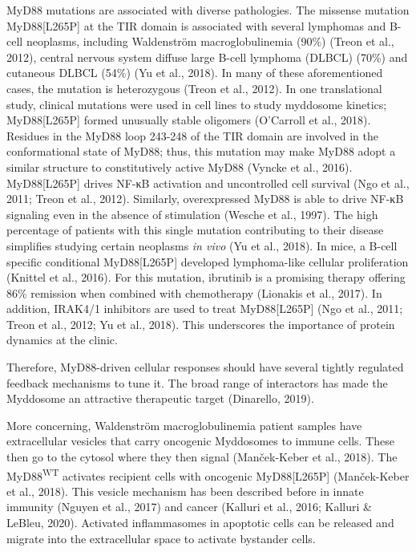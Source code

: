 MyD88 mutations are associated with diverse pathologies. The missense mutation MyD88[L265P] at the TIR domain is associated with several lymphomas and B-cell neoplasms, including Waldenström macroglobulinemia (90\%) (Treon et al., 2012), central nervous system diffuse large B-cell lymphoma (DLBCL) (70\%) and cutaneous DLBCL (54\%) (Yu et al., 2018). In many of these aforementioned cases, the mutation is heterozygous (Treon et al., 2012). In one translational study, clinical mutations were used in cell lines to study myddosome kinetics; MyD88[L265P] formed unusually stable oligomers (O’Carroll et al., 2018). Residues in the MyD88 loop 243-248 of the TIR domain are involved in the conformational state of MyD88; thus, this mutation may make MyD88 adopt a similar structure to constitutively active MyD88 (Vyncke et al., 2016). MyD88[L265P] drives NF-κB activation and uncontrolled cell survival (Ngo et al., 2011; Treon et al., 2012). Similarly, overexpressed MyD88 is able to drive NF-κB signaling even in the absence of stimulation (Wesche et al., 1997). The high percentage of patients with this single mutation contributing to their disease simplifies studying certain neoplasms \emph{in vivo} (Yu et al., 2018). In mice, a B-cell specific conditional MyD88[L265P] developed lymphoma-like cellular proliferation (Knittel et al., 2016). For this mutation, ibrutinib is a promising therapy offering 86\% remission when combined with chemotherapy (Lionakis et al., 2017). In addition, IRAK4/1 inhibitors are used to treat MyD88[L265P] (Ngo et al., 2011; Treon et al., 2012; Yu et al., 2018). This underscores the importance of protein dynamics at the clinic.

Therefore, MyD88-driven cellular responses should have several tightly regulated feedback mechanisms to tune it. The broad range of interactors has made the Myddosome an attractive therapeutic target (Dinarello, 2019).

More concerning, Waldenström macroglobulinemia patient samples have extracellular vesicles that carry oncogenic Myddosomes to immune cells. These then go to the cytosol where they then signal (Manček-Keber et al., 2018). The MyD88\textsuperscript{WT} activates recipient cells with oncogenic MyD88[L265P] (Manček-Keber et al., 2018). This vesicle mechanism has been described before in innate immunity (Nguyen et al., 2017) and cancer (Kalluri et al., 2016; Kalluri \& LeBleu, 2020). Activated inflammasomes in apoptotic cells can be released and migrate into the extracellular space to activate bystander cells.

